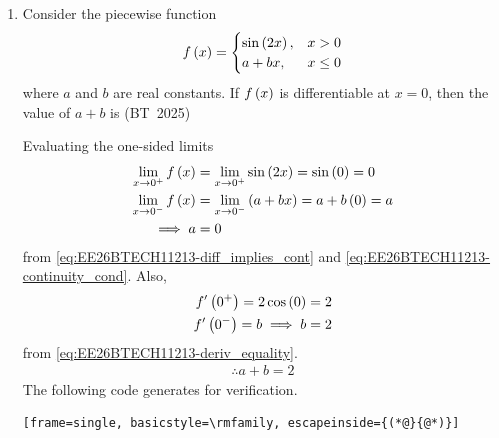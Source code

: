 \begin{enumerate}[label=\thesubsection.\arabic*, ref=\thesubsection.\theenumi,itemsep=0pt]
\begin{align}
\frac{d^2 y}{dt^2} &= C_1 e^t + C_2 e^{-t}
\end{align}
Substituting $y$, $\frac{dy}{dt}$, and $\frac{d^2 y}{dt^2}$ into 
    \eqref{eq:EE26BTECH11213-bt25_int-der},
\begin{align}
\brak{C_1 e^t + C_2 e^{-t}} + m\brak{C_1 e^t - C_2 e^{-t}} + n\brak{C_1 e^t + C_2 e^{-t}} &= 0
\\
\implies C_1 e^t \brak{1 + m + n} + C_2 e^{-t} \brak{1 - m + n} &= 0
\\
\text{or, }
m + n &= -1
\end{align}
\item Consider the piecewise function
\begin{align}
f\left(x\right) = \begin{cases}
\sin\left(2x\right), & x > 0 \\
a + bx, & x \le 0
\end{cases}
\end{align}
where $a$ and $b$ are real constants. If $f\left(x\right)$ is differentiable at $x = 0$, then the value of $a + b$ is
\hfill (BT~2025)
\begin{enumerate}[itemsep=0pt]
\end{enumerate}
\solution
Evaluating the one-sided limits
\begin{align}
	\lim_{x \to 0^+} f\left(x\right) &= \lim_{x \to 0^+} \sin\left(2x\right) = \sin\left(0\right) = 0 \\
\lim_{x \to 0^-} f\left(x\right) &= \lim_{x \to 0^-} \left(a + bx\right) = a + b\left(0\right) = a
\\
\implies
a &= 0
\end{align}
from \eqref{eq:EE26BTECH11213-diff_implies_cont} and \eqref{eq:EE26BTECH11213-continuity_cond}.
Also, 
\begin{align}
	f'\left(0^+\right) = 2\cos\left(0\right) &= 2
\\
	f'\left(0^-\right) = b
	\implies b &= 2
\end{align}
from \eqref{eq:EE26BTECH11213-deriv_equality}.
\begin{align}
\therefore a + b = 2
\end{align}
The following code generates
     for verification.
\begin{lstlisting}[frame=single, basicstyle=\rmfamily, escapeinside={(*@}{@*)}]

\end{lstlisting}
\end{enumerate}
